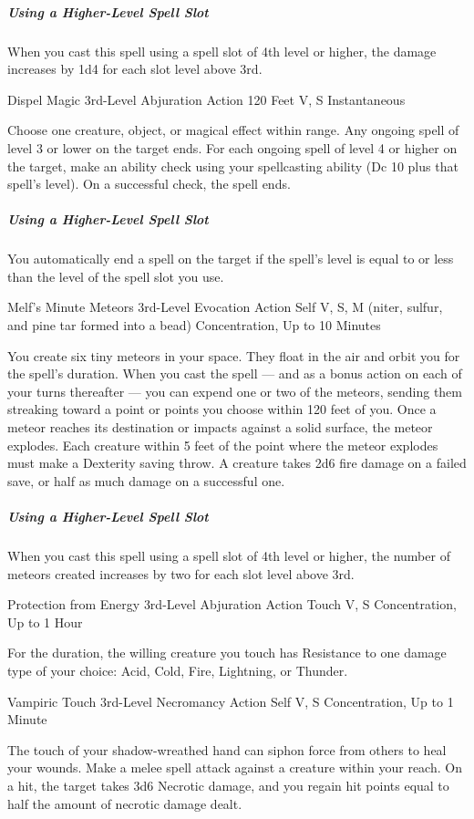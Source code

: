 \documentclass[letterpaper,openany,oneside,twocolumn]{book}
\begin{document}
\subparagraph*{Using a Higher-Level Spell Slot} When you cast this spell using a spell slot of 4th level or higher, the damage increases by 1d4 for each slot level above 3rd.

\DndSpellHeader
  {Dispel Magic}
  {3rd-Level Abjuration}
  {Action}
  {120 Feet}
  {V, S}
  {Instantaneous}

Choose one creature, object, or magical effect within range. Any ongoing spell of level 3 or lower on the target ends. For each ongoing spell of level 4 or higher on the target, make an ability check using your spellcasting ability (Dc 10 plus that spell's level). On a successful check, the spell ends.

\subparagraph*{Using a Higher-Level Spell Slot} You automatically end a spell on the target if the spell's level is equal to or less than the level of the spell slot you use.

\DndSpellHeader
  {Melf's Minute Meteors}
  {3rd-Level Evocation}
  {Action}
  {Self}
  {V, S, M (niter, sulfur, and pine tar formed into a bead)}
  {Concentration, Up to 10 Minutes}

You create six tiny meteors in your space. They float in the air and orbit you for the spell's duration. When you cast the spell — and as a bonus action on each of your turns thereafter — you can expend one or two of the meteors, sending them streaking toward a point or points you choose within 120 feet of you. Once a meteor reaches its destination or impacts against a solid surface, the meteor explodes. Each creature within 5 feet of the point where the meteor explodes must make a Dexterity saving throw. A creature takes 2d6 fire damage on a failed save, or half as much damage on a successful one.

\subparagraph*{Using a Higher-Level Spell Slot} When you cast this spell using a spell slot of 4th level or higher, the number of meteors created increases by two for each slot level above 3rd.

\DndSpellHeader
  {Protection from Energy}
  {3rd-Level Abjuration}
  {Action}
  {Touch}
  {V, S}
  {Concentration, Up to 1 Hour}

For the duration, the willing creature you touch has Resistance to one damage type of your choice: Acid, Cold, Fire, Lightning, or Thunder.

\DndSpellHeader
  {Vampiric Touch}
  {3rd-Level Necromancy}
  {Action}
  {Self}
  {V, S}
  {Concentration, Up to 1 Minute}

The touch of your shadow-wreathed hand can siphon force from others to heal your wounds. Make a melee spell attack against a creature within your reach. On a hit, the target takes 3d6 Necrotic damage, and you regain hit points equal to half the amount of necrotic damage dealt.
\end{document}
